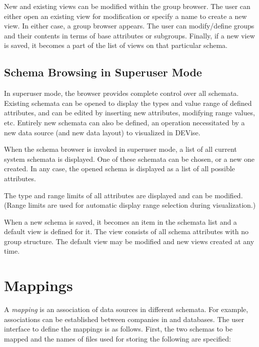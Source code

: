 New and existing views can be modified within the group browser.  The user can
either open an existing view for modification or specify a name to create a new
view. In either case, a group browser appears. The user can modify/define groups
and their contents in terms of base attributes or subgroups. Finally, if a new
view is saved, it becomes a part of the list of views on that particular schema.



\subsection{Schema Browsing in Superuser Mode}

In superuser mode, the browser provides complete control over all schemata.
Existing schemata can be opened to display the types and value range of defined
attributes, and can be edited by inserting new attributes, modifying range
values, etc. Entirely new schemata can also be defined, an operation
necessitated by a new data source (and new data layout) to visualized in DEVise.

When the schema browser is invoked in superuser mode, a list of all current
system schemata is displayed. One of these schemata can be chosen, or a new one
created. In any case, the opened schema is displayed as a list of all possible
attributes.

The type and range limits of all attributes are displayed and can be modified.
(Range limits are used for automatic display range selection during
visualization.)

When a new schema is saved, it becomes an item in the schemata list and a
default view is defined for it. The view consists of all schema attributes with
no group structure. The default view may be modified and new views created at
any time.


\section{Mappings}

A {\em mapping} is an association of data sources in different schemata. For
example, associations can be established between companies in 
and  databases. The user interface to define the mappings is as
follows. First, the two schemas to be mapped and the names of files used for
storing the following are specified:

